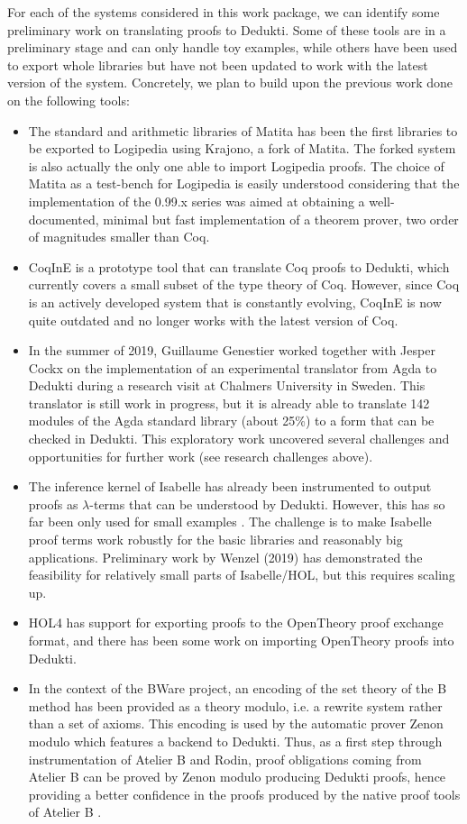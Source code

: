 For each of the systems considered in this work package, we can
identify some preliminary work on translating proofs to Dedukti. Some
of these tools are in a preliminary stage and can only handle toy
examples, while others have been used to export whole libraries but
have not been updated to work with the latest version of the
system. Concretely, we plan to build upon the previous work done on
the following tools:
\begin{itemize}
  \item The standard and arithmetic libraries of Matita has been the
  first libraries to be exported to Logipedia using Krajono, a fork of
  Matita. The forked system is also actually the only one able to
  import Logipedia proofs. The choice of Matita as a test-bench for
  Logipedia is easily understood considering that the implementation
  of the 0.99.x series was aimed at obtaining a well-documented,
  minimal but fast implementation of a theorem prover, two order of
  magnitudes smaller than Coq.
  \item CoqInE is a prototype tool that can translate Coq proofs to
  Dedukti, which currently covers a small subset of the type theory of
  Coq. However, since Coq is an actively developed system that is
  constantly evolving, CoqInE is now quite outdated and no longer
  works with the latest version of Coq.
  \item In the summer of 2019, Guillaume Genestier worked together
  with Jesper Cockx on the implementation of an experimental
  translator from Agda to Dedukti during a research visit at Chalmers
  University in Sweden. This translator is still work in progress, but
  it is already able to translate 142 modules of the Agda standard
  library (about 25\%) to a form that can be checked in Dedukti. This
  exploratory work uncovered several challenges and opportunities for
  further work (see research challenges above).
  \item The inference kernel of Isabelle has already been instrumented
  to output proofs as $\lambda$-terms that can be understood by
  Dedukti. However, this has so far been only used for small examples
  \cite{Berghofer-Nipkow:2000:TPHOL}. The challenge is to make
  Isabelle proof terms work robustly for the basic libraries and
  reasonably big applications.  Preliminary work by Wenzel (2019) has
  demonstrated the feasibility for relatively small parts of
  Isabelle/HOL, but this requires scaling up.
  \item HOL4 has support for exporting proofs to the OpenTheory proof
  exchange format, and there has been some work on importing
  OpenTheory proofs into Dedukti.
  \item In the context of the BWare project, an encoding of the set
  theory of the B method has been provided as a theory modulo, i.e. a
  rewrite system rather than a set of axioms. This encoding is used by
  the automatic prover Zenon modulo which features a backend to
  Dedukti. Thus, as a first step through instrumentation of Atelier B
  and Rodin, proof obligations coming from Atelier B can be proved by
  Zenon modulo producing Dedukti proofs, hence providing a better
  confidence in the proofs produced by the native proof tools of
  Atelier B \cite{Bware}.
\end{itemize}



